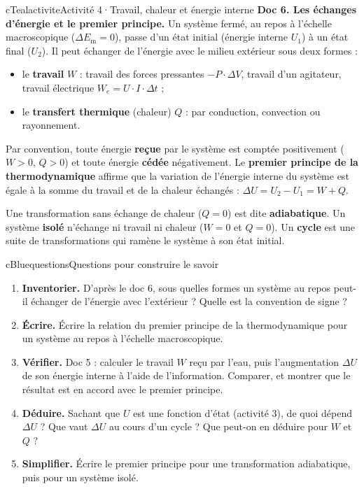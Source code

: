 \documentclass[11pt,a4paper]{article}
\newcommand{\kw}[1]{{\sffamily\bfseries\color{cBlue}#1}}   %
\newcommand{\Em}{E_{\mathrm{m}}}
\begin{document}
\begin{rub}{cTeal}{activite}{Activité 4\enspace·\enspace Travail, chaleur et énergie interne}
\textbf{Doc 6. Les échanges d’énergie et le premier principe.} Un système fermé, au repos à l’échelle macroscopique ($\Delta\Em = 0$), passe d’un état initial (énergie interne $U_1$) à un état final ($U_2$). Il peut échanger de l’énergie avec le milieu extérieur sous deux formes :
\begin{itemize}
  \item le \textbf{travail} $W$ : travail des forces pressantes $-P\cdot\Delta V$, travail d’un agitateur, travail électrique $W_e = U\cdot I\cdot\Delta t$ ;
  \item le \textbf{transfert thermique} (chaleur) $Q$ : par conduction, convection ou rayonnement.
\end{itemize}
Par convention, toute énergie \textbf{reçue} par le système est comptée positivement ($W > 0$, $Q > 0$) et toute énergie \textbf{cédée} négativement. Le \textbf{premier principe de la thermodynamique} affirme que la variation de l’énergie interne du système est égale à la somme du travail et de la chaleur échangés : $\Delta U = U_2 - U_1 = W + Q$.\par\smallskip
Une transformation sans échange de chaleur ($Q = 0$) est dite \textbf{adiabatique}. Un système \textbf{isolé} n’échange ni travail ni chaleur ($W = 0$ et $Q = 0$). Un \textbf{cycle} est une suite de transformations qui ramène le système à son état initial.
\end{rub}

\begin{rub}{cBlue}{questions}{Questions pour construire le savoir}
\begin{enumerate}
  \item \kw{Inventorier.} D’après le doc 6, sous quelles formes un système au repos peut-il échanger de l’énergie avec l’extérieur ? Quelle est la convention de signe ?
  \item \kw{Écrire.} Écrire la relation du premier principe de la thermodynamique pour un système au repos à l’échelle macroscopique.
  \item \kw{Vérifier.} Doc 5 : calculer le travail $W$ reçu par l’eau, puis l’augmentation $\Delta U$ de son énergie interne à l’aide de l’information. Comparer, et montrer que le résultat est en accord avec le premier principe.
  \item \kw{Déduire.} Sachant que $U$ est une fonction d’état (activité 3), de quoi dépend $\Delta U$ ? Que vaut $\Delta U$ au cours d’un cycle ? Que peut-on en déduire pour $W$ et $Q$ ?
  \item \kw{Simplifier.} Écrire le premier principe pour une transformation adiabatique, puis pour un système isolé.
\end{enumerate}
\end{rub}
\end{document}
